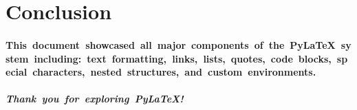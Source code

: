 \documentclass{article}
\begin{document}
{\begin{enumerate}
\end{enumerate}\relax\relax \section{Conclusion}\relax \relax\relax \paragraph{{\relax\relax This~document~showcased~\relax\relax \textbf{all~major~components}\relax \relax\relax ~of~the~PyLaTeX~system~including:~text~formatting,~links,~lists,~quotes,~code~blocks,~special~characters,~nested~structures,~and~custom~environments.}}\relax \relax\relax \paragraph{{\relax\relax \textit{Thank~you~for~exploring~PyLaTeX!}\relax }}\relax }
\end{document}
